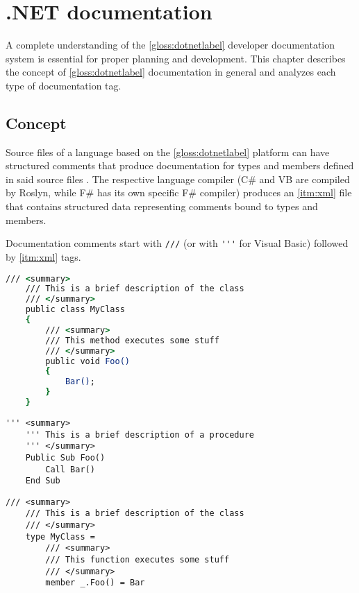 \chapter{.NET documentation} \label{chap:netDocumentation}

A complete understanding of the \ref{gloss:dotnetlabel} developer documentation system is essential for proper planning and development.
This chapter describes the concept of \ref{gloss:dotnetlabel} documentation in general and analyzes each type of documentation tag.

\section{Concept}

Source files of a language based on the \ref{gloss:dotnetlabel} platform can have structured comments that produce documentation for types and members defined in said source files \cite{wagner_xml_2022}. The respective language compiler (C\# and VB are compiled by Roslyn, while F\# has its own specific F\# compiler) produces an \ref{itm:xml} file that contains structured data representing comments bound to types and members.

Documentation comments start with \lstinline{///} (or with \lstinline{'''} for Visual Basic) followed by \ref{itm:xml} tags.

\begin{lstlisting}[language=csh, caption=C\# documentation example]
    /// <summary>
    /// This is a brief description of the class
    /// </summary>
    public class MyClass
    {
        /// <summary>
        /// This method executes some stuff
        /// </summary>
        public void Foo()
        {
            Bar();
        }
    }
\end{lstlisting}

\begin{lstlisting}[caption=Visual Basic documentation example]
    ''' <summary>
    ''' This is a brief description of a procedure
    ''' </summary>
    Public Sub Foo()
        Call Bar()
    End Sub
\end{lstlisting}

\begin{lstlisting}[caption=F\# documentation example]
    /// <summary>
    /// This is a brief description of the class
    /// </summary>
    type MyClass =
        /// <summary>
        /// This function executes some stuff
        /// </summary>
        member _.Foo() = Bar
\end{lstlisting}

